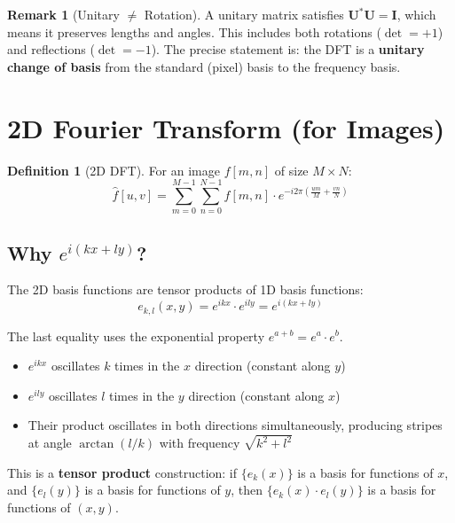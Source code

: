 \documentclass[11pt,a4paper]{article}
\theoremstyle{definition}
\newtheorem{definition}{Definition}[section]
\newtheorem{remark}{Remark}[section]
\begin{document}
\begin{remark}[Unitary $\neq$ Rotation]
A unitary matrix satisfies $\mathbf{U}^*\mathbf{U} = \mathbf{I}$, which means it preserves lengths and angles. This includes both rotations ($\det = +1$) and reflections ($\det = -1$). The precise statement is: the DFT is a \textbf{unitary change of basis} from the standard (pixel) basis to the frequency basis.
\end{remark}

\section{2D Fourier Transform (for Images)}

\begin{definition}[2D DFT]
For an image $f[m, n]$ of size $M \times N$:
\begin{equation}
    \hat{f}[u, v] = \sum_{m=0}^{M-1} \sum_{n=0}^{N-1} f[m, n] \cdot e^{-i2\pi\left(\frac{um}{M} + \frac{vn}{N}\right)}
\end{equation}
\end{definition}

\subsection{Why $e^{i(kx + ly)}$?}

The 2D basis functions are tensor products of 1D basis functions:
\begin{equation}
    e_{k,l}(x, y) = e^{ikx} \cdot e^{ily} = e^{i(kx + ly)}
\end{equation}

The last equality uses the exponential property $e^{a+b} = e^a \cdot e^b$.

\begin{itemize}
    \item $e^{ikx}$ oscillates $k$ times in the $x$ direction (constant along $y$)
    \item $e^{ily}$ oscillates $l$ times in the $y$ direction (constant along $x$)
    \item Their product oscillates in both directions simultaneously, producing stripes at angle $\arctan(l/k)$ with frequency $\sqrt{k^2 + l^2}$
\end{itemize}

This is a \textbf{tensor product} construction: if $\{e_k(x)\}$ is a basis for functions of $x$, and $\{e_l(y)\}$ is a basis for functions of $y$, then $\{e_k(x) \cdot e_l(y)\}$ is a basis for functions of $(x, y)$.
\end{document}
